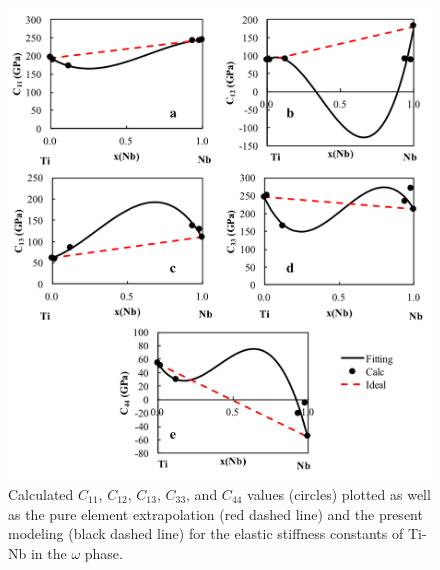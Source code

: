 \pagebreak
\begin{figure}[H]
	\centering
	\includegraphics[width=\textwidth]{Chapter-7/Figures/omegae1.png}
	\caption{Calculated $C_{11}$, $C_{12}$, $C_{13}$, $C_{33}$, and $C_{44}$ values (circles) plotted as well as the pure element extrapolation (red dashed line) and the present modeling (black dashed line) for the elastic stiffness constants of Ti-Nb in the $\omega$ phase.}
	\label{Ch7-figure:omegae1}
\end{figure}

